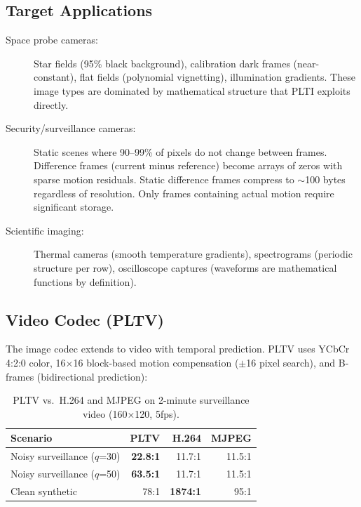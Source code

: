 \documentclass[11pt,a4paper]{article}
\begin{document}
\subsection{Target Applications}

\begin{description}
\item[Space probe cameras:] Star fields (95\% black background), calibration dark frames (near-constant), flat fields (polynomial vignetting), illumination gradients. These image types are dominated by mathematical structure that PLTI exploits directly.

\item[Security/surveillance cameras:] Static scenes where 90--99\% of pixels do not change between frames. Difference frames (current minus reference) become arrays of zeros with sparse motion residuals. Static difference frames compress to $\sim$100 bytes regardless of resolution. Only frames containing actual motion require significant storage.

\item[Scientific imaging:] Thermal cameras (smooth temperature gradients), spectrograms (periodic structure per row), oscilloscope captures (waveforms are mathematical functions by definition).
\end{description}

\subsection{Video Codec (PLTV)}

The image codec extends to video with temporal prediction. PLTV uses YCbCr 4:2:0 color, 16$\times$16 block-based motion compensation ($\pm$16 pixel search), and B-frames (bidirectional prediction):

\begin{table}[H]
\centering
\small
\begin{tabular}{@{}lrrr@{}}
\toprule
\textbf{Scenario} & \textbf{PLTV} & \textbf{H.264} & \textbf{MJPEG} \\
\midrule
Noisy surveillance ($q$=30) & \textbf{22.8:1} & 11.7:1 & 11.5:1 \\
Noisy surveillance ($q$=50) & \textbf{63.5:1} & 11.7:1 & 11.5:1 \\
Clean synthetic & 78:1 & \textbf{1874:1} & 95:1 \\
\bottomrule
\end{tabular}
\caption{PLTV vs.\ H.264 and MJPEG on 2-minute surveillance video (160$\times$120, 5fps).}
\end{table}
\end{document}

